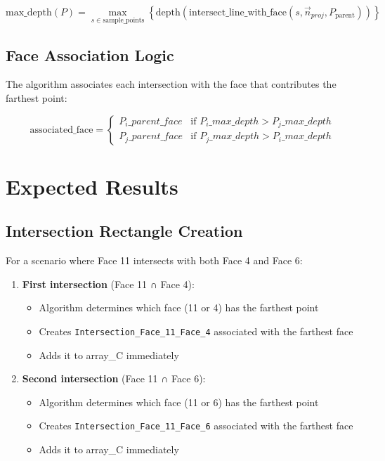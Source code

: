 \documentclass[12pt,a4paper]{article}
\begin{document}
\begin{equation}
\text{max\_depth}(P) = \max_{s \in \text{sample\_points}} \left\{ \text{depth}(\text{intersect\_line\_with\_face}(s, \vec{n}_{proj}, P_{\text{parent}})) \right\}
\end{equation}

\subsection{Face Association Logic}

The algorithm associates each intersection with the face that contributes the farthest point:

\begin{equation}
\text{associated\_face} = \begin{cases}
P_i\_parent\_face & \text{if } P_i\_max\_depth > P_j\_max\_depth \\
P_j\_parent\_face & \text{if } P_j\_max\_depth > P_i\_max\_depth
\end{cases}
\end{equation}

\section{Expected Results}

\subsection{Intersection Rectangle Creation}

For a scenario where Face 11 intersects with both Face 4 and Face 6:

\begin{enumerate}
    \item \textbf{First intersection} (Face 11 ∩ Face 4):
    \begin{itemize}
        \item Algorithm determines which face (11 or 4) has the farthest point
        \item Creates \texttt{Intersection\_Face\_11\_Face\_4} associated with the farthest face
        \item Adds it to array\_C immediately
    \end{itemize}
    
    \item \textbf{Second intersection} (Face 11 ∩ Face 6):
    \begin{itemize}
        \item Algorithm determines which face (11 or 6) has the farthest point
        \item Creates \texttt{Intersection\_Face\_11\_Face\_6} associated with the farthest face
        \item Adds it to array\_C immediately
    \end{itemize}
\end{enumerate}
\end{document}
